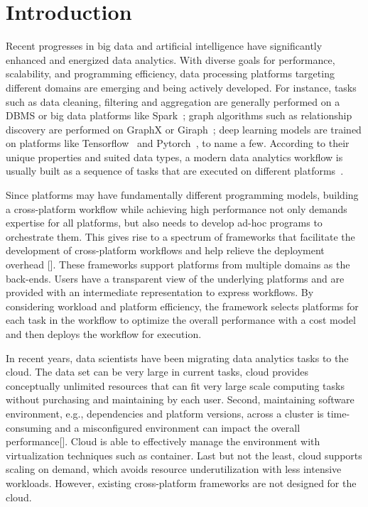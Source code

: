 \section{Introduction}

Recent progresses in big data and artificial intelligence have significantly enhanced and energized data analytics.  With diverse goals for performance, scalability, and programming efficiency, data processing platforms targeting different domains are emerging and being actively developed. For instance, tasks such as data cleaning, filtering and aggregation are generally
performed on a DBMS or big data platforms like Spark~\cite{}; graph algorithms such as relationship discovery are performed on GraphX or Giraph~\cite{}; deep learning models are trained on platforms like Tensorflow~\cite{} and Pytorch~\cite{}, to name a few.
According to their unique properties and suited data types, a modern data analytics workflow is usually built as a sequence of tasks that are executed on different platforms~\cite{}. 

Since platforms may have fundamentally different programming
models, building a cross-platform workflow while achieving 
high performance not only demands expertise for all platforms, but also needs to develop ad-hoc programs to orchestrate them. 
This gives rise to a spectrum of frameworks that facilitate the development of cross-platform workflows and help relieve the deployment overhead []. 
These frameworks support platforms from multiple domains as the back-ends. Users have a transparent view of the underlying platforms and are provided with an intermediate representation to express workflows. 
By considering workload and platform efficiency, the framework selects platforms for each task in the workflow to optimize the overall performance with a cost model and then deploys the workflow for execution.

In recent years, data scientists have been migrating data analytics tasks to the cloud. The data set can be very large in current tasks, cloud provides conceptually unlimited resources that can fit very large scale computing tasks without purchasing and maintaining by each user. Second, maintaining software environment, e.g., dependencies and platform versions, across a cluster is time-consuming and a misconfigured environment can impact the overall performance[]. Cloud is able to effectively manage the environment with virtualization techniques such as container. Last but not the least, cloud supports scaling on demand, which avoids resource underutilization with less intensive workloads. However, existing cross-platform frameworks are not designed for the cloud.

